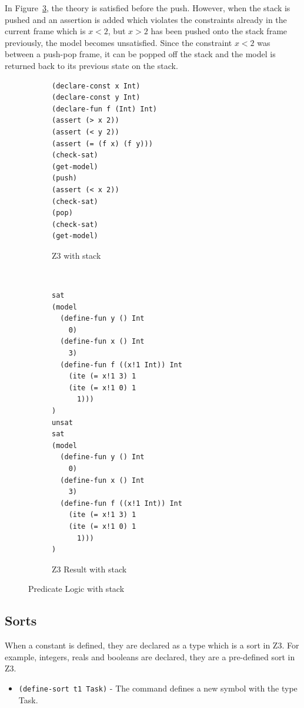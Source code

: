 \documentclass[a4paper]{report}
\begin{document}
In Figure~\ref{fig:Predicate Logic with stack}, the theory is satisfied before the push. However, when the stack is pushed and an assertion is added which violates the constraints already in the current frame which is $x < 2$, but $x > 2$ has been pushed onto the stack frame previously, the model becomes unsatisfied. Since the constraint $x < 2$ was between a push-pop frame, it can be popped off the stack and the model is returned back to its previous state on the stack.\\
\begin{figure}[!htb]
\centering
\begin{subfigure}[b]{\textwidth}
\lstset{numbers=left, showspaces=false,
    showstringspaces=false, tabsize=2, breaklines=true,
    xleftmargin=5.0ex,
}
\lstset{basicstyle=\ttfamily}
\centering
\begin{lstlisting}[frame=single]
(declare-const x Int)
(declare-const y Int)
(declare-fun f (Int) Int)
(assert (> x 2))
(assert (< y 2))
(assert (= (f x) (f y)))
(check-sat)
(get-model)
(push)
(assert (< x 2))
(check-sat)
(pop)
(check-sat)
(get-model)
\end{lstlisting}
\caption{Z3 with stack}
\label{fig:Z3 with stack}
\end{subfigure}\\
\begin{subfigure}[b]{\textwidth}
\lstset{basicstyle=\ttfamily}
\begin{lstlisting}[frame=single]
sat
(model 
  (define-fun y () Int
    0)
  (define-fun x () Int
    3)
  (define-fun f ((x!1 Int)) Int
    (ite (= x!1 3) 1
    (ite (= x!1 0) 1
      1)))
)
unsat
sat
(model 
  (define-fun y () Int
    0)
  (define-fun x () Int
    3)
  (define-fun f ((x!1 Int)) Int
    (ite (= x!1 3) 1
    (ite (= x!1 0) 1
      1)))
)
\end{lstlisting}
\caption{Z3 Result with stack}
\label{fig:Z3 Function stack}
\end{subfigure}
\caption{Predicate Logic with stack}
\label{fig:Predicate Logic with stack}
\end{figure} 

\subsection{Sorts}
When a constant is defined, they are declared as a type which is a sort in Z3. For example, integers, reals and booleans are declared, they are a pre-defined sort in Z3. 
\begin{itemize}
\item \texttt{(define-sort t1 Task)} - The command defines a new symbol with the type Task.
\end{itemize}
\end{document}
